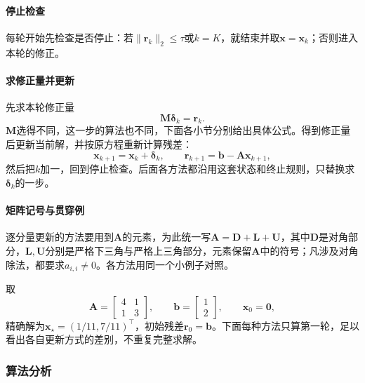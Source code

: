 \paragraph{停止检查}
每轮开始先检查是否停止：若$\lVert\bm r_k\rVert_2\leq\tau$或$k=K$，就结束并取$\bm x=\bm x_k$；否则进入本轮的修正。

\paragraph{求修正量并更新}
先求本轮修正量
\[
\bm M\bm\delta_k=\bm r_k .
\]
$\bm M$选得不同，这一步的算法也不同，下面各小节分别给出具体公式。得到修正量后更新当前解，并按原方程重新计算残差：
\[
\bm x_{k+1}=\bm x_k+\bm\delta_k ,\qquad
\bm r_{k+1}=\bm b-\bm A\bm x_{k+1},
\]
然后把$k$加一，回到停止检查。后面各方法都沿用这套状态和终止规则，只替换求$\bm\delta_k$的一步。

\paragraph{矩阵记号与贯穿例}
逐分量更新的方法要用到$\bm A$的元素，为此统一写$\bm A=\bm D+\bm L+\bm U$，其中$\bm D$是对角部分，$\bm L,\bm U$分别是严格下三角与严格上三角部分，元素保留$\bm A$中的符号；凡涉及对角除法，都要求$a_{i,i}\neq0$。各方法用同一个小例子对照。
\begin{example}[定常迭代的贯穿例]
\label{ex:ls-stationary-running-example}
取
\[
\bm A=\begin{bmatrix}4&1\\1&3\end{bmatrix},\qquad
\bm b=\begin{bmatrix}1\\2\end{bmatrix},\qquad
\bm x_0=\bm 0,
\]
精确解为$\bm x_\star=(1/11,7/11)^\top$，初始残差$\bm r_0=\bm b$。下面每种方法只算第一轮，足以看出各自更新方式的差别，不重复完整求解。
\end{example}

\subsubsection{算法分析}


